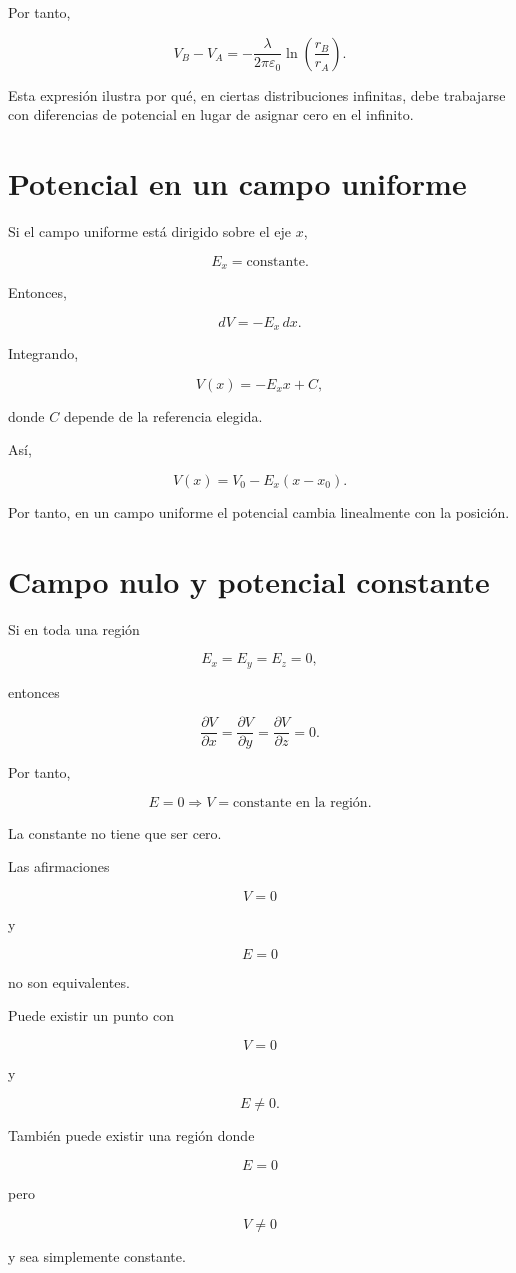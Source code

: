 Por tanto,

\begin{equation}
\boxed{
V_B-V_A
=
-\frac{\lambda}{2\pi\varepsilon_0}
\ln\left(\frac{r_B}{r_A}\right)
}.
\end{equation}

Esta expresión ilustra por qué, en ciertas distribuciones infinitas, debe trabajarse
con diferencias de potencial en lugar de asignar cero en el infinito.


\section{Potencial en un campo uniforme}

Si el campo uniforme está dirigido sobre el eje \(x\),

\[
E_x=\text{constante}.
\]

Entonces,

\[
dV=-E_x\,dx.
\]

Integrando,

\[
V(x)=-E_xx+C,
\]

donde \(C\) depende de la referencia elegida.

Así,

\begin{equation}
\boxed{
V(x)=V_0-E_x(x-x_0)
}.
\end{equation}

Por tanto, en un campo uniforme el potencial cambia linealmente con la posición.


\section{Campo nulo y potencial constante}

Si en toda una región

\[
E_x=E_y=E_z=0,
\]

entonces

\[
\frac{\partial V}{\partial x}
=
\frac{\partial V}{\partial y}
=
\frac{\partial V}{\partial z}
=0.
\]

Por tanto,

\[
\boxed{
E=0
\Longrightarrow
V=\text{constante en la región}
}.
\]

La constante no tiene que ser cero.


\begin{advertencia}

Las afirmaciones

\[
V=0
\]

y

\[
E=0
\]

no son equivalentes.

Puede existir un punto con

\[
V=0
\]

y

\[
E\neq0.
\]

También puede existir una región donde

\[
E=0
\]

pero

\[
V\neq0
\]

y sea simplemente constante.

\end{advertencia}


